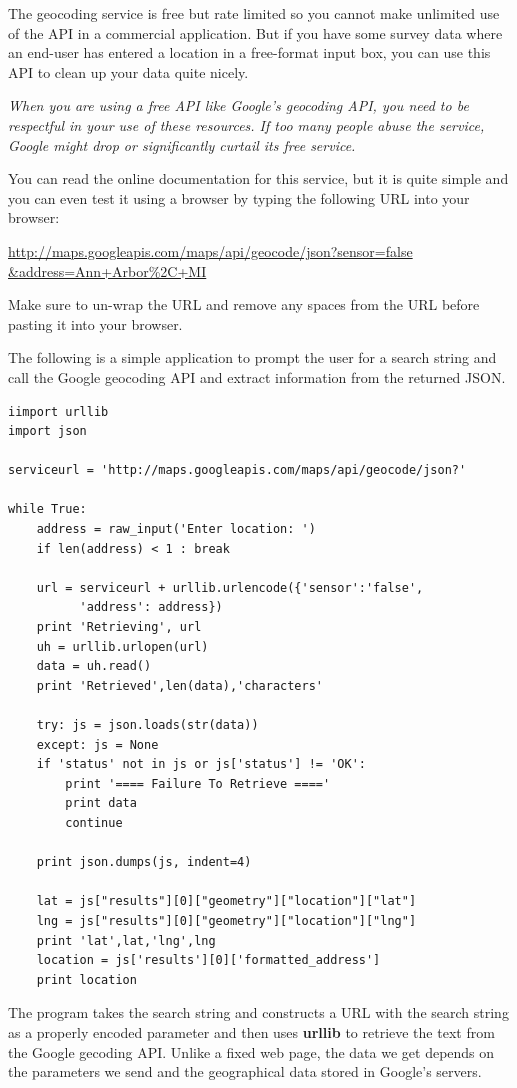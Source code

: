 \documentclass[11pt]{book}
\begin{document}
The geocoding service is free but rate limited so you cannot make unlimited
use of the API in a commercial application.   But if you have some survey data
where an end-user has entered a location in a free-format input box, you can use
this API to clean up your data quite nicely.  

{\em When you are using a free API like Google's geocoding API, you need
to be respectful in your use of these resources.  If too many people abuse the
service, Google might drop or significantly curtail its free service.}

You can read the online documentation for this service, but it is quite simple
and you can even test it using a browser by typing the following URL into your 
browser:

\url{http://maps.googleapis.com/maps/api/geocode/json?sensor=false &address=Ann+Arbor%2C+MI}

Make sure to un-wrap the URL and remove any spaces from the URL before pasting
it into your browser.

The following is a simple application to prompt the user for a search string
and call the Google geocoding API and extract information from the returned
JSON.

\beforeverb
\begin{verbatim}
iimport urllib
import json

serviceurl = 'http://maps.googleapis.com/maps/api/geocode/json?'

while True:
    address = raw_input('Enter location: ')
    if len(address) < 1 : break

    url = serviceurl + urllib.urlencode({'sensor':'false', 
          'address': address})
    print 'Retrieving', url
    uh = urllib.urlopen(url)
    data = uh.read()
    print 'Retrieved',len(data),'characters'

    try: js = json.loads(str(data))
    except: js = None
    if 'status' not in js or js['status'] != 'OK':
        print '==== Failure To Retrieve ===='
        print data
        continue

    print json.dumps(js, indent=4)

    lat = js["results"][0]["geometry"]["location"]["lat"]
    lng = js["results"][0]["geometry"]["location"]["lng"]
    print 'lat',lat,'lng',lng
    location = js['results'][0]['formatted_address']
    print location
\end{verbatim}
\afterverb
%
The program takes the search string and constructs a URL with the
search string as a properly encoded parameter and then uses
{\bf urllib} to retrieve the text from the Google gecoding API.
Unlike a fixed web page, the data we get depends on the parameters
we send and the geographical data stored in Google's servers.
\end{document}
